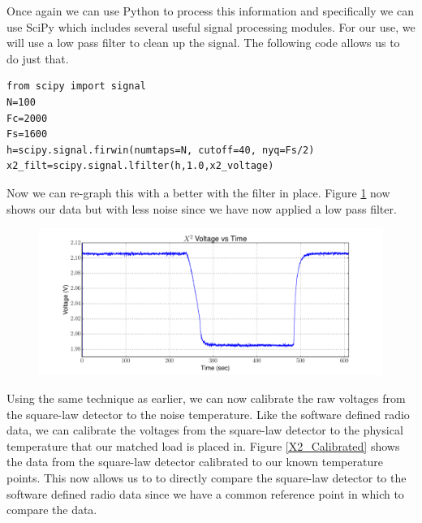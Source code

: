 Once again we can use Python to process this information and specifically we can use SciPy which includes several useful signal processing modules.  For our use, we will use a low pass filter to clean up the signal.  The following code allows us to do just that.

\begin{lstlisting}[frame=single,keywordstyle=\color{blue}]
from scipy import signal
N=100
Fc=2000
Fs=1600
h=scipy.signal.firwin(numtaps=N, cutoff=40, nyq=Fs/2)
x2_filt=scipy.signal.lfilter(h,1.0,x2_voltage)
\end{lstlisting}

Now we can re-graph this with a better with the filter in place.  Figure \ref{X2_filter} now shows our data but with less noise since we have now applied a low pass filter.

\begin{figure}[h!tb] \centering

\includegraphics[width=\textwidth]{Experiments/Exp1/x2_filter.pdf}

\label{X2_filter}
\end{figure}

Using the same technique as earlier, we can now calibrate the raw voltages from the square-law detector to the noise temperature.  Like the software defined radio data, we can calibrate the voltages from the square-law detector to the physical temperature that our matched load is placed in.  Figure \ref{X2_Calibrated} shows the data from the square-law detector calibrated to our known temperature points.  This now allows us to to directly compare the square-law detector to the software defined radio data since we have a common reference point in which to compare the data.

